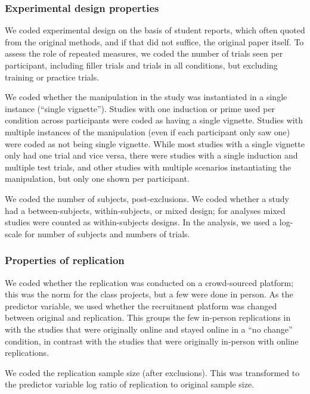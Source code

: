 \documentclass[
  english,
  a4paper,
]{article}
\begin{document}
\hypertarget{experimental-design-properties}{%
\subsubsection{Experimental design properties}\label{experimental-design-properties}}

We coded experimental design on the basis of student reports, which often quoted from the original methods, and if that did not suffice, the original paper itself. To assess the role of repeated measures, we coded the number of trials seen per participant, including filler trials and trials in all conditions, but excluding training or practice trials.

We coded whether the manipulation in the study was instantiated in a single instance (``single vignette''). Studies with one induction or prime used per condition across participants were coded as having a single vignette. Studies with multiple instances of the manipulation (even if each participant only saw one) were coded as not being single vignette. While most studies with a single vignette only had one trial and vice versa, there were studies with a single induction and multiple test trials, and other studies with multiple scenarios instantiating the manipulation, but only one shown per participant.

We coded the number of subjects, post-exclusions. We coded whether a study had a between-subjects, within-subjects, or mixed design; for analyses mixed studies were counted as within-subjects designs. In the analysis, we used a log-scale for number of subjects and numbers of trials.

\hypertarget{properties-of-replication}{%
\subsubsection{Properties of replication}\label{properties-of-replication}}

We coded whether the replication was conducted on a crowd-sourced platform; this was the norm for the class projects, but a few were done in person. As the predictor variable, we used whether the recruitment platform was changed between original and replication. This groups the few in-person replications in with the studies that were originally online and stayed online in a ``no change'' condition, in contrast with the studies that were originally in-person with online replications.

We coded the replication sample size (after exclusions). This was transformed to the predictor variable log ratio of replication to original sample size.
\end{document}
